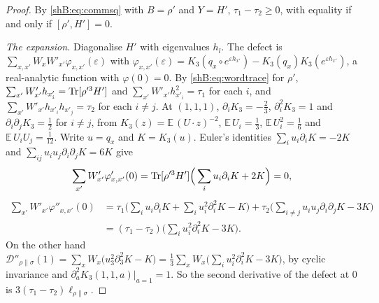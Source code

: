 \begin{proof}
By \eqref{shB:eq:commsq} with $B=\rho'$ and $Y=H'$, $\tau_1-\tau_2\ge0$, with equality if and only if $[\rho',H']=0$.

\emph{The expansion.} Diagonalise $H'$ with eigenvalues $h_l$. The defect is $\sum_{x,x'}W_xW'_{x'}\varphi_{x,x'}(\varepsilon)$ with $\varphi_{x,x'}(\varepsilon)=K_3(q_x\circ e^{\varepsilon h_{x'}})-K_3(q_x)K_3(e^{\varepsilon h_{x'}})$, a real-analytic function with $\varphi(0)=0$. By \eqref{shB:eq:wordtrace} for $\rho'$, $\sum_{x'}W'_{x'}h_{x'_i}=\operatorname{Tr}[\rho'^3H']$ and $\sum_{x'}W'_{x'}h^2_{x'_i}=\tau_1$ for each $i$, and $\sum_{x'}W'_{x'}h_{x'_i}h_{x'_j}=\tau_2$ for each $i\ne j$. At $(1,1,1)$, $\partial_iK_3=-\frac23$, $\partial_i^2K_3=1$ and $\partial_i\partial_jK_3=\frac12$ for $i\ne j$, from $K_3(z)=\mathbb E\,(U\cdot z)^{-2}$, $\mathbb E\,U_i=\frac13$, $\mathbb E\,U_i^2=\frac16$ and $\mathbb E\,U_iU_j=\frac1{12}$. Write $u=q_x$ and $K=K_3(u)$. Euler's identities $\sum_iu_i\partial_iK=-2K$ and $\sum_{ij}u_iu_j\partial_i\partial_jK=6K$ give
\[
\sum_{x'}W'_{x'}\varphi'_{x,x'}(0)=\operatorname{Tr}[\rho'^3H']\Big(\sum_iu_i\partial_iK+2K\Big)=0,
\]
\[
\begin{aligned}
\sum_{x'}W'_{x'}\varphi''_{x,x'}(0)&=\tau_1\Big(\sum_iu_i\partial_iK+\sum_iu_i^2\partial_i^2K-K\Big)+\tau_2\Big(\sum_{i\ne j}u_iu_j\partial_i\partial_jK-3K\Big)\\
&=(\tau_1-\tau_2)\Big(\sum_iu_i^2\partial_i^2K-3K\Big).
\end{aligned}
\]
On the other hand $\mathcal D''_{\rho\|\sigma}(1)=\sum_xW_x\big(u_3^2\partial_3^2K-K\big)=\frac13\sum_xW_x\big(\sum_iu_i^2\partial_i^2K-3K\big)$, by cyclic invariance and $\partial_a^2K_3(1,1,a)|_{a=1}=1$. So the second derivative of the defect at $0$ is $3(\tau_1-\tau_2)\ell_{\rho\|\sigma}$.


\end{proof}
